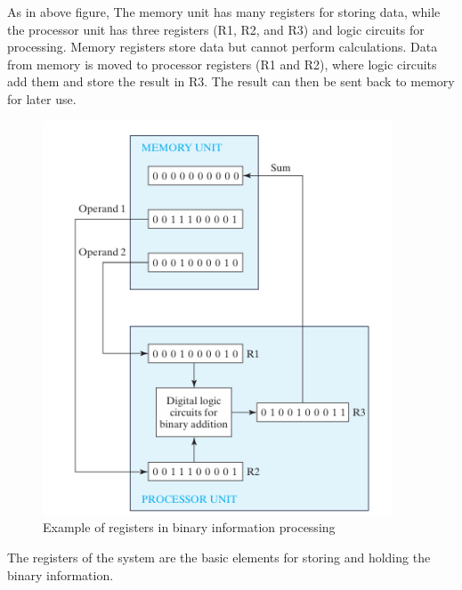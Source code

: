 \documentclass{article}
\begin{document}
As in above figure, The memory unit has many registers for storing data, while the processor unit has three registers (R1, R2, and R3) and logic circuits for processing. Memory registers store data but cannot perform calculations. Data from memory is moved to processor registers (R1 and R2), where logic circuits add them and store the result in R3. The result can then be sent back to memory for later use. 
\begin{figure}
    \centering
    \includegraphics[width=0.926\textwidth]{figs/figure2.png}
    \caption{Example of registers in binary information processing}
    \label{fig:enter-label}
\end{figure}
The registers of the system are the basic elements for storing and 
holding the binary information. 
\end{document}
